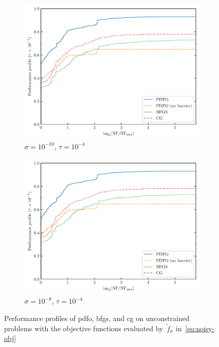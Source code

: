 \documentclass[
    smallextended,  %
    final,        %
]{svjour3}
\newcommand{\obj}{f}
\begin{document}
\begin{figure}[htbp]
\begin{subfigure}{.32\textwidth}
        \centering
        \includegraphics[width=\textwidth,page=1]{perf-nan-bfgs_cg_pdfo-50-10-0.01.pdf}
        \caption{$\sigma = 10^{-10}$, $\tau = 10^{-4}$}
        \label{fig:ppu-fdiff-noisy-6}
    \end{subfigure}
    \hfill
    \begin{subfigure}{.32\textwidth}
        \centering
        \includegraphics[width=\textwidth,page=1]{perf-nan-bfgs_cg_pdfo-50-10-0.01.pdf}
        \caption{$\sigma = 10^{-8}$, $\tau = 10^{-4}$}
        \label{fig:ppu-fdiff-noisy-6}
    \end{subfigure}
    \caption{Performance profiles of \gls{pdfo}, \gls{bfgs}, and \gls{cg} on unconstrained problems
    with the objective functions evaluated by~$\tilde{\obj}_\sigma$ in~\eqref{eq:noisy-obj}}
    \label{fig:noise}
\end{figure}
\end{document}
